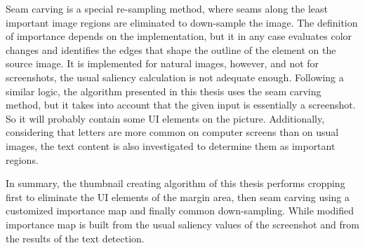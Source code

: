 \documentclass[draft,final]{vutinfth} %
\begin{document}
	Seam carving is a special re-sampling method, where seams along the least important image regions are eliminated to down-sample the image.
	The definition of importance depends on the implementation, but it in any case evaluates color changes and identifies the edges that shape the outline of the element on the source image.
	It is implemented for natural images, however, and not for screenshots, the usual saliency calculation is not adequate enough.
	Following a similar logic, the algorithm presented in this thesis uses the seam carving method, but it takes into account that the given input is essentially a screenshot.
	So it will probably contain some UI elements on the picture.
	Additionally, considering that letters are more common on computer screens than on usual images, the text content is also investigated to determine them as important regions.\par
	In summary, the thumbnail creating algorithm of this thesis performs cropping first to eliminate the UI elements of the margin area, then seam carving using a customized importance map and finally common down-sampling.
	While modified importance map is built from the usual saliency values of the screenshot and from the results of the text detection.
	
\end{document}
